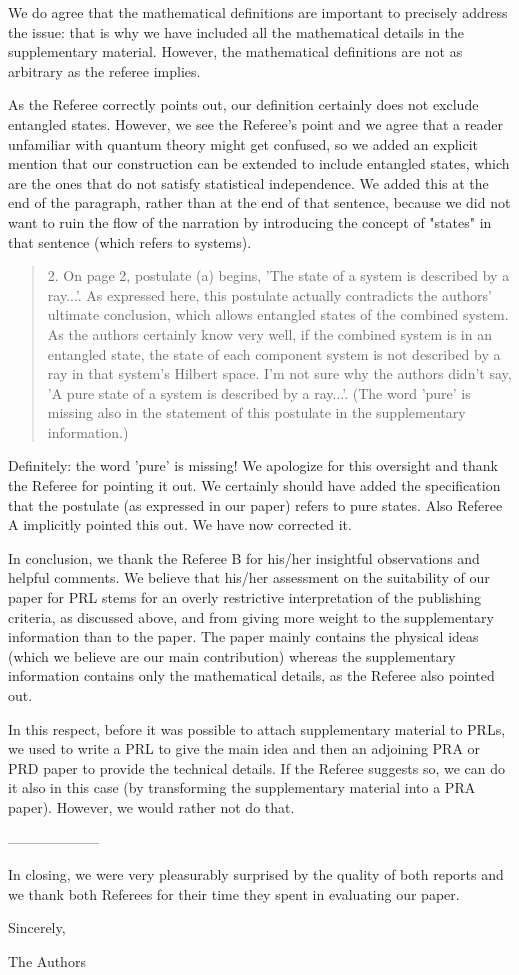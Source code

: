\documentclass[11pt]{article}
\begin{document}
We do agree that the mathematical definitions are important to precisely
address the issue: that is why we have included all the mathematical
details in the supplementary material. However, the mathematical definitions
are not as arbitrary as the referee implies.

As the Referee correctly points out, our definition certainly does not
exclude entangled states. However, we see the Referee's point and we
agree that a reader unfamiliar with quantum theory might get confused,
so we added an explicit mention that our construction can be extended
to include entangled states, which are the ones that do not satisfy
statistical independence. We added this at the end of the paragraph,
rather than at the end of that sentence, because we did not want to
ruin the flow of the narration by introducing the concept of "states"
in that sentence (which refers to systems).

\begin{quote}
2. On page 2, postulate (a) begins, 'The state of a system
is described by a ray...'. As expressed here, this postulate actually
contradicts the authors' ultimate conclusion, which allows entangled
states of the combined system. As the authors certainly know very
well, if the combined system is in an entangled state, the state of
each component system is not described by a ray in that system's
Hilbert space. I'm not sure why the authors didn't say, 'A pure state
of a system is described by a ray...'. (The word 'pure' is missing
also in the statement of this postulate in the supplementary
information.)
\end{quote}

Definitely: the word 'pure' is missing! We apologize for this
oversight and thank the Referee for pointing it out. We certainly
should have added the specification that the postulate (as expressed
in our paper) refers to pure states. Also Referee A implicitly pointed
this out. We have now corrected it.

In conclusion, we thank the Referee B for his/her insightful
observations and helpful comments. We believe that his/her assessment
on the suitability of our paper for PRL stems for an overly
restrictive interpretation of the publishing criteria, as discussed
above, and from giving more weight to the supplementary information
than to the paper. The paper mainly contains the physical ideas (which
we believe are our main contribution) whereas the supplementary
information contains only the mathematical details, as the Referee
also pointed out.

In this respect, before it was possible to attach supplementary
material to PRLs, we used to write a PRL to give the main idea and
then an adjoining PRA or PRD paper to provide the technical
details. If the Referee suggests so, we can do it also in this case
(by transforming the supplementary material into a PRA
paper). However, we would rather not do that.

--------------------


In closing, we were very pleasurably surprised by the quality of both
reports and we thank both Referees for their time they spent in
evaluating our paper.

Sincerely,

The Authors
\end{document}
